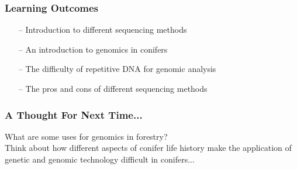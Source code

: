 \documentclass{beamer}
\begin{document}
	
	
	\begin{frame}
		\frametitle{Learning Outcomes}
		\begin{itemize}
			\item[--] Introduction to different sequencing methods
			\item[--] An introduction to genomics in conifers
			\item[--] The difficulty of repetitive DNA for genomic analysis
			\item[--] The pros and cons of different sequencing methods
		\end{itemize}
	\end{frame}


\begin{frame}
	\frametitle{A Thought For Next Time...}
	\Huge What are some uses for genomics in forestry?\\
	\vspace{20pt}
	\normalsize Think about how different aspects of conifer life history make the application of genetic and genomic technology difficult in conifers...
\end{frame}


		
\end{document}
